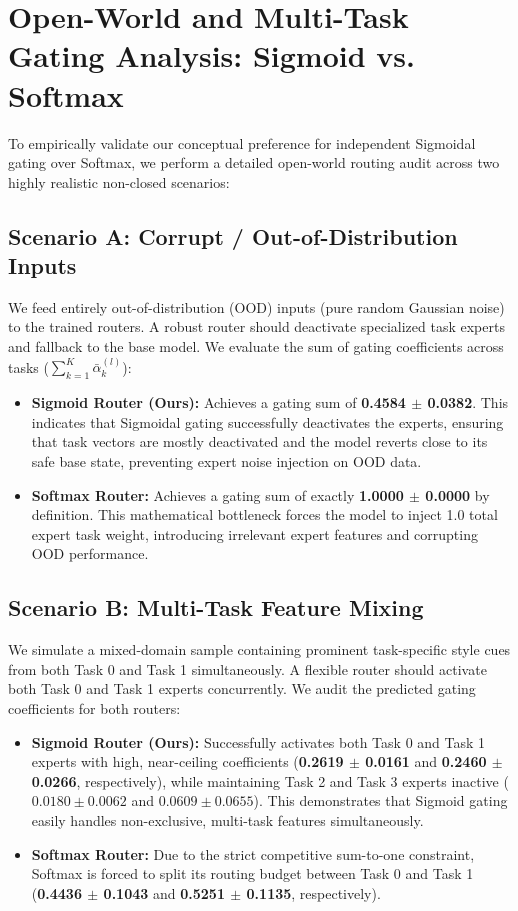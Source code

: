 \section{Open-World and Multi-Task Gating Analysis: Sigmoid vs. Softmax}
\label{app:open_world_gating}
To empirically validate our conceptual preference for independent Sigmoidal gating over Softmax, we perform a detailed open-world routing audit across two highly realistic non-closed scenarios:

\subsection{Scenario A: Corrupt / Out-of-Distribution Inputs}
We feed entirely out-of-distribution (OOD) inputs (pure random Gaussian noise) to the trained routers. A robust router should deactivate specialized task experts and fallback to the base model. We evaluate the sum of gating coefficients across tasks ($\sum_{k=1}^K \bar{\alpha}_k^{(l)}$):
\begin{itemize}
    \item \textbf{Sigmoid Router (Ours):} Achieves a gating sum of \textbf{0.4584 $\pm$ 0.0382}. This indicates that Sigmoidal gating successfully deactivates the experts, ensuring that task vectors are mostly deactivated and the model reverts close to its safe base state, preventing expert noise injection on OOD data.
    \item \textbf{Softmax Router:} Achieves a gating sum of exactly \textbf{1.0000 $\pm$ 0.0000} by definition. This mathematical bottleneck forces the model to inject 1.0 total expert task weight, introducing irrelevant expert features and corrupting OOD performance.
\end{itemize}

\subsection{Scenario B: Multi-Task Feature Mixing}
We simulate a mixed-domain sample containing prominent task-specific style cues from both Task 0 and Task 1 simultaneously. A flexible router should activate both Task 0 and Task 1 experts concurrently. We audit the predicted gating coefficients for both routers:
\begin{itemize}
    \item \textbf{Sigmoid Router (Ours):} Successfully activates both Task 0 and Task 1 experts with high, near-ceiling coefficients (\textbf{0.2619 $\pm$ 0.0161} and \textbf{0.2460 $\pm$ 0.0266}, respectively), while maintaining Task 2 and Task 3 experts inactive ($0.0180 \pm 0.0062$ and $0.0609 \pm 0.0655$). This demonstrates that Sigmoid gating easily handles non-exclusive, multi-task features simultaneously.
    \item \textbf{Softmax Router:} Due to the strict competitive sum-to-one constraint, Softmax is forced to split its routing budget between Task 0 and Task 1 (\textbf{0.4436 $\pm$ 0.1043} and \textbf{0.5251 $\pm$ 0.1135}, respectively). 
\end{itemize}

